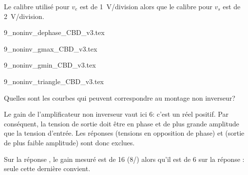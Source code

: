 Le calibre utilisé pour \(v_{e}\) est de \SI{1}{\volt}/division alors que le calibre pour \(v_{s}\) est de \SI{2}{\volt}/division.


\bigskip




\begin{enonce}
\def\scaleImageCDE{1.1}
  \begin{listeQCM2Colonnes}
  \item 
  \shorthandoff{!:}
    {9_noninv_dephase_CBD_v3.tex}\bigskip\bigskip
   \shorthandon{!:}
    
  \item 
  \shorthandoff{!:}
    {9_noninv_gmax_CBD_v3.tex}
   \shorthandon{!:}
    
  \item 
  \shorthandoff{!:}
    {9_noninv_gmin_CBD_v3.tex}\bigskip\bigskip
  \shorthandon{!:}
  
  \item 
  \shorthandoff{!:}
	{9_noninv_triangle_CBD_v3.tex}
  \shorthandon{!:}
  \end{listeQCM2Colonnes}
  
  \bigskip
  \bigskip
 Quelles sont les courbes qui peuvent correspondre au montage non inverseur? 

\end{enonce}

\reponse{\reponseD{}}

\begin{corrige}
  Le gain de l’amplificateur non inverseur vaut ici 6: c’est un réel positif. Par conséquent, la tension de sortie doit être en phase et de plus grande amplitude que la tension d’entrée. Les réponses \reponseA{} (tensions en opposition de phase) et \reponseC{} (sortie de plus faible amplitude) sont donc exclues.

  Sur la réponse \reponseB{}, le gain mesuré est de 16 (8/) alors qu’il est de 6 sur la réponse \reponseD{}: seule cette dernière convient.
\end{corrige}


\finEntrainement


